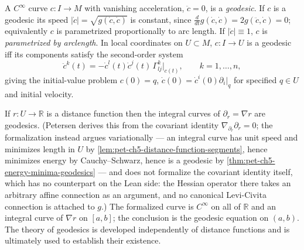 \begin{definition}
  \label{def:pet-ch5-geodesic}


  A $C^\infty$ curve $c:I\to M$ with vanishing acceleration, $\ddot c=0$, is a
  \emph{geodesic}. If $c$ is a geodesic its speed $|\dot c|=\sqrt{g(\dot c,\dot c)}$
  is constant, since $\frac{d}{dt}g(\dot c,\dot c)=2g(\ddot c,\dot c)=0$; equivalently
  $c$ is parametrized proportionally to arc length. If $|\dot c|\equiv1$, $c$ is
  \emph{parametrized by arclength}. In local coordinates on $U\subset M$, $c:I\to U$
  is a geodesic iff its components satisfy the second-order system
  \[
    \ddot c^k(t)=-\dot c^l(t)\dot c^j(t)\,\Gamma^k_{lj}|_{c(t)},\qquad k=1,\dots,n,
  \]
  giving the initial-value problem $c(0)=q$, $\dot c(0)=\dot c^i(0)\partial_i|_q$ for
  specified $q\in U$ and initial velocity.
\end{definition}

\begin{remark}
  \label{rem:pet-ch5-distance-function-geodesics}


  If $r:U\to\mathbb R$ is a distance function then the integral curves of
  $\partial_r=\nabla r$ are geodesics.  (Petersen derives this from the covariant
  identity $\nabla_{\partial_r}\partial_r=0$; the formalization instead argues
  variationally — an integral curve has unit speed and minimizes length in $U$ by
  \cref{lem:pet-ch5-distance-function-segments}, hence minimizes energy by
  Cauchy–Schwarz, hence is a geodesic by
  \cref{thm:pet-ch5-energy-minima-geodesics} — and does not formalize the
  covariant identity itself, which has no counterpart on the Lean side: the
  Hessian operator there takes an arbitrary affine connection as an argument, and
  no canonical Levi-Civita connection is attached to $g$.)  The formalized curve
  is $C^\infty$ on all of $\mathbb R$ and an integral curve of $\nabla r$ on
  $[a,b]$; the conclusion is the geodesic equation on $(a,b)$.
  The theory of geodesics is developed independently of distance functions and is
  ultimately used to establish their existence.
\end{remark}

